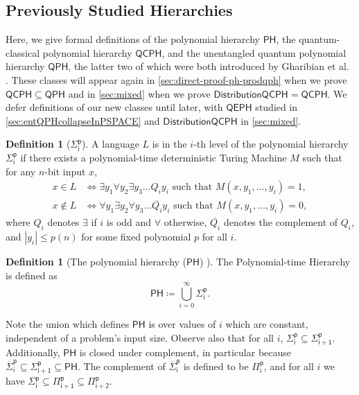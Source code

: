\documentclass[11pt]{article}
\theoremstyle{definition}
\newtheorem{definition}[theorem]{Definition}
\newcommand{\class}[1]{\ensuremath{\mathsf{#1}}\xspace}
\newcommand{\PH}{\class{PH}}
\newcommand{\Sigmai}[1][i]{\class{\Sigma^{p}_{#1}}}
\newcommand{\Pii}[1][i]{\class{\Pi^{p}_{#1}}}
\newcommand{\QCPH}{\class{QCPH}}
\newcommand{\QPH}{\class{QPH}}
\newcommand{\QEPH}{\class{QEPH}}
\newcommand{\distributionQCPH}{\mathsf{DistributionQCPH}}
\newcommand{\abs}[1]{\left\lvert #1 \right\rvert}
\begin{document}
\subsection{Previously Studied Hierarchies}\label{subsec:prelim-qph}

Here, we give formal definitions of the polynomial hierarchy $\PH$, 
the quantum-classical polynomial hierarchy $\QCPH$,
and the unentangled quantum polynomial hierarchy $\QPH$, the latter two of which were both introduced by Gharibian et al. \cite{GSSSY22_qph}.
These classes will appear again in \cref{sec:direct-proof-ph-prodqph} when we prove $\QCPH\subseteq \QPH$ and in \cref{sec:mixed} when we prove $\distributionQCPH= \QCPH$.
We defer definitions of our new classes until later, with $\QEPH$ studied in \cref{sec:entQPHcollapseInPSPACE} and $\distributionQCPH$ in \cref{sec:mixed}.

\begin{definition}[$\Sigmai$]
    A language $L$ is in the $i$-th level of the polynomial hierarchy $\Sigmai$ if there exists a polynomial-time deterministic Turing Machine $M$ such that for any $n$-bit input $x$,
    \begin{align*}
        x\in L &\iff  \exists y_1 \forall y_2 \exists y_3 \dots Q_i y_i \text{ such that } M(x,y_1,\dots,y_i)=1 , \\
        x\not\in L &\iff \forall y_1 \exists y_2 \forall y_3 \dots \overline{Q_i} y_i \text{ such that } M(x,y_1,\dots,y_i)=0 ,
    \end{align*}
    where $Q_i$ denotes $\exists$ if $i$ is odd and $\forall$ otherwise, $\overline{Q_i}$ denotes the complement of $Q_i$, and $\abs{y_i} \leq p(n)$ for some fixed polynomial $p$ for all $i$.
\end{definition}

\begin{definition}[The polynomial hierarchy ($\PH$) \cite{stockmeyer1976polynomial}] The Polynomial-time Hierarchy is defined as 
    \[\PH \coloneqq \bigcup_{i=0}^{\infty} \Sigmai.\]
\end{definition}

Note the union which defines $\PH$ is over values of $i$ which are constant, independent of a problem's input size.
Observe also that for all $i$, $\Sigmai[i]\subseteq \Sigmai[i+1]$. Additionally, $\PH$ is closed under complement, in particular because $\class{\overline{\Sigma}_i^p} \subseteq \Sigmai[i+1] \subseteq \PH$. 
The complement of $\class{\overline{\Sigma}_i^p}$ is defined to be $\Pii[i]$, and for all $i$ we have $\Sigmai[i]\subseteq \Pii[i+1] \subseteq \Pii[i+2]$.
\end{document}
